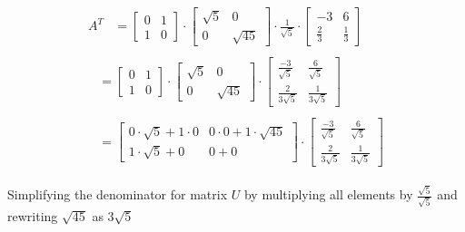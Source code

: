 \documentclass[a4paper]{report}
\begin{document}
\begin{align*}
    \begin{split}
        A^T&= \begin{bmatrix}
    0&1\\1&0
\end{bmatrix}\cdot\begin{bmatrix}
    \sqrt{5}&0\\0&\sqrt{45}
\end{bmatrix} \cdot \frac{1}{\sqrt{5}}\cdot\begin{bmatrix}
    -3&6\\ \frac{2}{3}&\frac{1}{3}
\end{bmatrix} 
    \end{split} \\
    \begin{split}
        &=\begin{bmatrix}
    0&1\\1&0
\end{bmatrix}\cdot\begin{bmatrix}
    \sqrt{5}&0\\0&\sqrt{45}
\end{bmatrix} \cdot\begin{bmatrix}
    \frac{-3}{\sqrt{5}}&\frac{6}{\sqrt{5}}\\ \frac{2}{3\sqrt{5}}&\frac{1}{3\sqrt{5}}
\end{bmatrix}
    \end{split} \\
    \begin{split}
        &=\begin{bmatrix}
    0\cdot \sqrt{5}+1\cdot 0&0\cdot 0+1\cdot \sqrt{45}\\
    1\cdot \sqrt{5}+0&0+0
\end{bmatrix} \cdot\begin{bmatrix}
    \frac{-3}{\sqrt{5}}&\frac{6}{\sqrt{5}}\\ \frac{2}{3\sqrt{5}}&\frac{1}{3\sqrt{5}}
\end{bmatrix} 
    \end{split}
\end{align*}



Simplifying the denominator for matrix $U$ by multiplying all elements by $\frac{\sqrt{5}}{\sqrt{5}}$ and rewriting $\sqrt{45}$ as $3\sqrt{5}$
\end{document}
